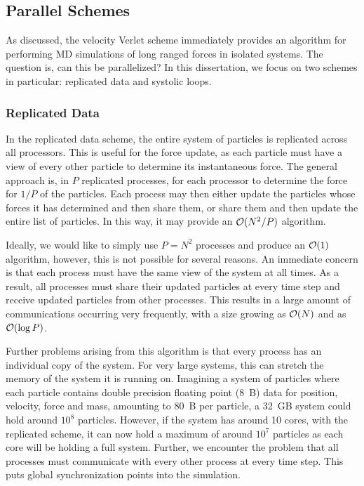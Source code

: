 \subsection{Parallel Schemes}

%
As discussed, the velocity Verlet scheme immediately provides an algorithm for
performing MD simulations of long ranged forces in isolated systems.
%
The question is, can this be parallelized?
%
In this dissertation, we focus on two schemes in particular:
replicated data and systolic loops.



\subsubsection{Replicated Data}

%
In the replicated data scheme,
the entire system of particles is replicated across all processors.
%
This is useful for the force update, as each particle must have a view of
every other particle to determine its instantaneous force.
%
The general approach is, in $P$ replicated processes, for each processor
to determine the force for $1/P$ of the particles.
%
Each process may then either update the particles whose forces it has
determined and then share them, or share them and then update the entire
list of particles.
%
In this way, it may provide an $\mathcal{O}{(N^2/P)}$ algorithm.

%
Ideally, we would like to simply use $P = N^2$ processes and produce an
$\mathcal{O}{(1)}$ algorithm, however, this is not possible for several reasons.
%
An immediate concern is that each process must have the same view of the
system at all times.
%
As a result, all processes must share their updated particles at
every time step and receive updated particles from other processes.
%
This results in a large amount of communications occurring very frequently,
with a size growing as $\mathcal{O}{(N)}$ and as $\mathcal{O}{(\log{P})}$.

Further problems arising from this algorithm is that every process has
an individual copy of the system.
%
For very large systems, this can stretch the memory of the system
it is running on.
%
Imagining a system of particles where each particle contains double
precision floating point (8~B) data for position, velocity, force and mass,
amounting to 80~B per particle, a 32~GB system could hold around $10^8$
particles.
%
However, if the system has around 10 cores, with the replicated scheme,
it can now hold a maximum of around $10^7$ particles as each core will
be holding a full system.
%
Further, we encounter the problem that all processes must communicate
with every other process at every time step.
%
This puts global synchronization points into the simulation.

